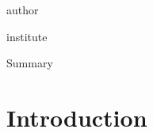 \documentclass[aspectratio=169,10pt,xcolor={dvipsnames}]{beamer}
\begin{document}
{\begin{frame}
\begin{textblock*}{\textwidth}
            \begin{beamercolorbox}[sep=8pt, left,colsep=-4bp,rounded=true,shadow=true]{author}
               \insertauthor
            \end{beamercolorbox}

    	    \begin{beamercolorbox}[sep=8pt,center,colsep=-4bp,rounded=true,shadow=true]{institute}
               \insertinstitute
            \end{beamercolorbox}

        \end{textblock*}
    \end{frame}
}




\begin{frame}{Summary}
\tableofcontents
\end{frame}

\section{Introduction}
\end{document}
